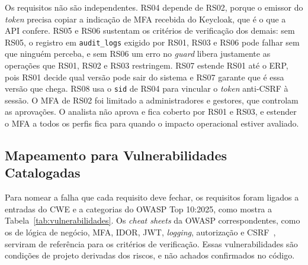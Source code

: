 \documentclass[conference]{IEEEtran}
\begin{document}
Os requisitos não são independentes. RS04 depende de RS02, porque o emissor do \textit{token} precisa copiar a indicação de MFA recebida do Keycloak, que é o que a API confere. RS05 e RS06 sustentam os critérios de verificação dos demais: sem RS05, o registro em \texttt{audit\_logs} exigido por RS01, RS03 e RS06 pode falhar sem que ninguém perceba, e sem RS06 um erro no \textit{guard} libera justamente as operações que RS01, RS02 e RS03 restringem. RS07 estende RS01 até o ERP, pois RS01 decide qual versão pode sair do sistema e RS07 garante que é essa versão que chega. RS08 usa o \texttt{sid} de RS04 para vincular o \textit{token} anti-CSRF à sessão. O MFA de RS02 foi limitado a administradores e gestores, que controlam as aprovações. O analista não aprova e fica coberto por RS01 e RS03, e estender o MFA a todos os perfis fica para quando o impacto operacional estiver avaliado.
\subsection{Mapeamento para Vulnerabilidades Catalogadas}
\label{subsec:vulnerabilidades}

Para nomear a falha que cada requisito deve fechar, os requisitos foram ligados a entradas do CWE e a categorias do OWASP Top 10:2025, como mostra a Tabela~\ref{tab:vulnerabilidades}. Os \textit{cheat sheets} da OWASP correspondentes, como os de lógica de negócio, MFA, IDOR, JWT, \textit{logging}, autorização e CSRF~\cite{owaspcheatsheets}, serviram de referência para os critérios de verificação. Essas vulnerabilidades são condições de projeto derivadas dos riscos, e não achados confirmados no código.
\end{document}
